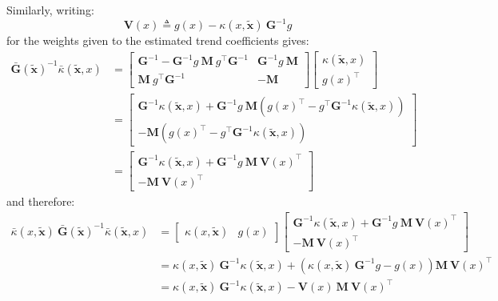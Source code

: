 Similarly, writing:
\begin{equation}
	\mathbf{V}(x)\triangleq g(x)-\kappa(x,\tilde{\mathbf{x}})\:\mathbf{G}^{-1}g
\end{equation}
for the weights given to the estimated trend coefficients gives:
\begin{equation}
	\begin{aligned}
	\bar{\mathbf{G}}(\tilde{\mathbf{x}})^{-1}\bar{\kappa}(\tilde{\mathbf{x}},x)&=\begin{bmatrix}\mathbf{G}^{-1}-\mathbf{G}^{-1}g\:\mathbf{M}\:g^\top \mathbf{G}^{-1}&\mathbf{G}^{-1}g\:\mathbf{M}\\\mathbf{M}\:g^\top \mathbf{G}^{-1}&-\mathbf{M}\end{bmatrix}\begin{bmatrix}\kappa(\tilde{\mathbf{x}},x)\\g(x)^\top\end{bmatrix}\\
	&=\begin{bmatrix}\mathbf{G}^{-1}\kappa(\tilde{\mathbf{x}},x)+\mathbf{G}^{-1}g\:\mathbf{M}\left(g(x)^\top-g^\top \mathbf{G}^{-1}\kappa(\tilde{\mathbf{x}},x)\right)\\-\mathbf{M}\left(g(x)^\top-g^\top \mathbf{G}^{-1}\kappa(\tilde{\mathbf{x}},x)\right)\end{bmatrix}\\
	&=\begin{bmatrix}\mathbf{G}^{-1}\kappa(\tilde{\mathbf{x}},x)+\mathbf{G}^{-1}g\:\mathbf{M}\:\mathbf{V}(x)^\top\\-\mathbf{M}\:\mathbf{V}(x)^\top\end{bmatrix}
	\end{aligned}
\end{equation}
and therefore:
\begin{equation}
	\begin{aligned}
	\bar{\kappa}(x,\tilde{\mathbf{x}})\:\bar{\mathbf{G}}(\tilde{\mathbf{x}})^{-1}\bar{\kappa}(\tilde{\mathbf{x}},x)&=\begin{bmatrix}\kappa(x,\tilde{\mathbf{x}})&g(x)\end{bmatrix}\begin{bmatrix}\mathbf{G}^{-1}\kappa(\tilde{\mathbf{x}},x)+\mathbf{G}^{-1}g\:\mathbf{M}\:\mathbf{V}(x)^\top\\-\mathbf{M}\:\mathbf{V}(x)^\top\end{bmatrix}\\
	&=\kappa(x,\tilde{\mathbf{x}})\:\mathbf{G}^{-1}\kappa(\tilde{\mathbf{x}},x)+\left(\kappa(x,\tilde{\mathbf{x}})\:\mathbf{G}^{-1}g-g(x)\right)\mathbf{M}\:\mathbf{V}(x)^\top\\
	&=\kappa(x,\tilde{\mathbf{x}})\:\mathbf{G}^{-1}\kappa(\tilde{\mathbf{x}},x)-\mathbf{V}(x)\:\mathbf{M}\:\mathbf{V}(x)^\top
	\end{aligned}
\end{equation}

